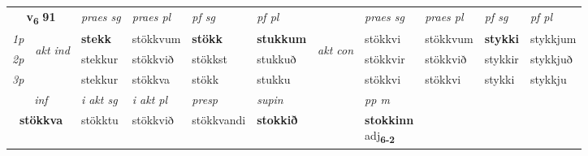 \noindent
\begin{tabular}{lllllllllll} \toprule
\multicolumn{2}{c}{\textbf{v{\textsubscript{6}}} \Large{\textbf{91}}}  &  \textit{praes sg}  & \textit{praes pl}  &\textit{ pf sg} & \textit{pf pl} &  &  \textit{praes sg}  & \textit{praes pl}  & \textit{pf sg} & \textit{pf pl } \\*
	\cmidrule{3-6} \cmidrule{8-11}
 {\textit{1p}} & \multirow{3}{*}{\begin{turn}{90}\textit{akt ind}\end{turn}} & \textbf{stekk} & stökkvum & \textbf{stökk} & \textbf{stukkum} & \multirow{3}{*}{\begin{turn}{90}\textit{akt con}\end{turn}} &stökkvi & stökkvum & \textbf{stykki} & stykkjum\\*
 {\textit{2p}} &  &  stekkur  & stökkvið & stökkst & stukkuð & & stökkvir & stökkvið & stykkir & stykkjuð \\*
{\textit{3p}} &  & stekkur & stökkva & stökk & stukku & & stökkvi & stökkvi& stykki & stykkju \\*
\cmidrule{3-6} \cmidrule{8-11}

   \multicolumn{2}{c}{\textit{inf}}  & \textit{i akt sg} & \textit{i akt pl}   & \textit{presp} & \textit{supin}  && \textit{pp m} \\*
  \multicolumn{2}{c}{\textbf{stökkva}} & stökktu  & stökkvið   & stökkvandi &  \textbf{stokkið}  && \specialcell{\textbf{stokkinn} \\ adj\textbf{\textsubscript{6-2}}} \\*
\end{tabular}

